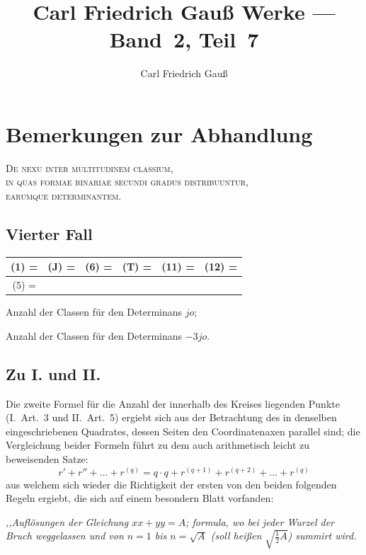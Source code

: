 \documentclass[12pt,a4paper]{article}
\title{Carl Friedrich Gauß Werke --- Band~2, Teil~7}
\author{Carl Friedrich Gauß}
\date{}
\begin{document}
\maketitle
\thispagestyle{empty}
\tableofcontents
\newpage


\section*{Bemerkungen zur Abhandlung}
\begin{center}
\Large\textsc{De nexu inter multitudinem classium,\\
in quas formae binariae secundi gradus distribuuntur,\\
earumque determinantem.}
\end{center}


\subsection*{Vierter Fall}

\begin{center}
\begin{tabular}{|c|c|c|c|c|c|}
\hline
(1) = & (J) = & (6) = & (T) = & (11) = & (12) = \\
\hline
(5) = & & & & & \\
\hline
\end{tabular}
\end{center}

Anzahl der Classen für den Determinans $jo$;

Anzahl der Classen für den Determinans $-3jo$.


\subsection*{Zu I. und II.}

Die zweite Formel für die Anzahl der innerhalb des Kreises liegenden Punkte
(I.~Art.~3 und II.~Art.~5) ergiebt sich aus der Betrachtung des in denselben eingeschriebenen Quadrates,
dessen Seiten den Coordinatenaxen parallel sind; die Vergleichung beider Formeln führt zu dem auch
arithmetisch leicht zu beweisenden Satze:
\[
r' + r'' + \ldots + r^{(q)} = q \cdot q + r^{(q+1)} + r^{(q+2)} + \ldots + r^{(q)}
\]
aus welchem sich wieder die Richtigkeit der ersten von den beiden folgenden Regeln ergiebt,
die sich auf einem besondern Blatt vorfanden:

\textit{,,Auflösungen der Gleichung $xx + yy = A$; formula, wo bei jeder Wurzel der Bruch weggelassen
und von $n = 1$ bis $n = \sqrt{A}$ (soll heißen $\sqrt{\tfrac{1}{2}A}$) summirt wird.}
\end{document}
